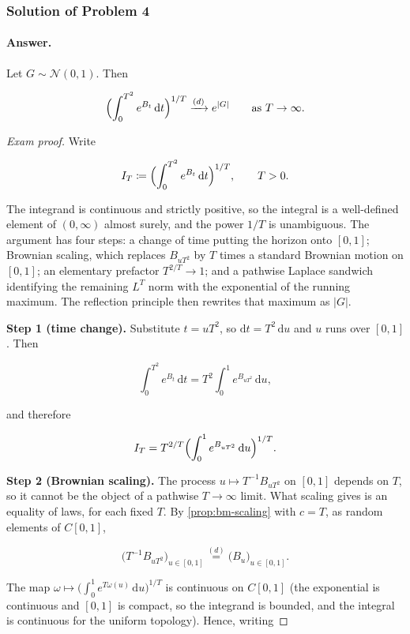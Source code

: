 \documentclass[11pt,a4paper]{article}
\begin{document}
\subsubsection{Solution of Problem 4}

\paragraph{Answer.}

Let \(G\sim\mathcal{N}(0,1)\). Then

\[
\Bigl(\int_0^{T^2} e^{B_t}\,\mathrm{d}t\Bigr)^{1/T}
\xrightarrow{(d)}
e^{|G|}
\qquad\text{as }T\to\infty.
\]

\begin{proof}[Exam proof]
Write

\[
I_T
\coloneqq
\Bigl(\int_0^{T^2} e^{B_t}\,\mathrm{d}t\Bigr)^{1/T},
\qquad
T>0.
\]

The integrand is continuous and strictly positive, so the integral is a well-defined element of \((0,\infty)\) almost surely, and the power \(1/T\) is unambiguous. The argument has four steps: a change of time putting the horizon onto \([0,1]\); Brownian scaling, which replaces \(B_{uT^2}\) by \(T\) times a standard Brownian motion on \([0,1]\); an elementary prefactor \(T^{2/T}\to 1\); and a pathwise Laplace sandwich identifying the remaining \(L^T\) norm with the exponential of the running maximum. The reflection principle then rewrites that maximum as \(|G|\).

\textbf{Step 1 (time change).}
Substitute \(t=uT^2\), so \(\mathrm{d}t=T^2\,\mathrm{d}u\) and \(u\) runs over \([0,1]\). Then

\[
\int_0^{T^2} e^{B_t}\,\mathrm{d}t
=
T^2\int_0^1 e^{B_{uT^2}}\,\mathrm{d}u,
\]

and therefore

\[
I_T
=
T^{2/T}
\Bigl(\int_0^1 e^{B_{uT^2}}\,\mathrm{d}u\Bigr)^{1/T}.
\]

\textbf{Step 2 (Brownian scaling).}
The process \(u\mapsto T^{-1}B_{uT^2}\) on \([0,1]\) depends on \(T\), so it cannot be the object of a pathwise \(T\to\infty\) limit. What scaling gives is an equality of laws, for each fixed \(T\). By \cref{prop:bm-scaling} with \(c=T\), as random elements of \(C[0,1]\),

\[
\bigl(T^{-1}B_{uT^2}\bigr)_{u\in[0,1]}
\stackrel{(d)}{=}
\bigl(B_u\bigr)_{u\in[0,1]}.
\]

The map \(\omega\mapsto\bigl(\int_0^1 e^{T\omega(u)}\,\mathrm{d}u\bigr)^{1/T}\) is continuous on \(C[0,1]\) (the exponential is continuous and \([0,1]\) is compact, so the integrand is bounded, and the integral is continuous for the uniform topology). Hence, writing


\end{proof}
\end{document}
